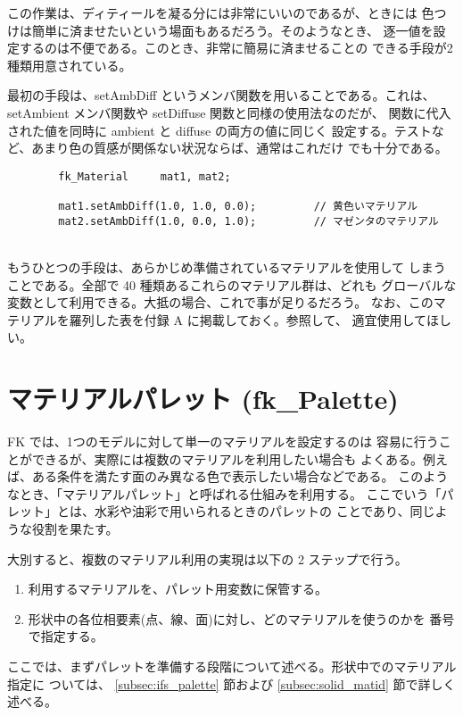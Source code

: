 この作業は、ディティールを凝る分には非常にいいのであるが、ときには
色つけは簡単に済ませたいという場面もあるだろう。そのようなとき、
逐一値を設定するのは不便である。このとき、非常に簡易に済ませることの
できる手段が2種類用意されている。

最初の手段は、setAmbDiff というメンバ関数を用いることである。これは、
setAmbient メンバ関数や setDiffuse 関数と同様の使用法なのだが、
関数に代入された値を同時に ambient と diffuse の両方の値に同じく
設定する。テストなど、あまり色の質感が関係ない状況ならば、通常はこれだけ
でも十分である。
\\
\begin{screen}
\begin{verbatim}
        fk_Material     mat1, mat2;

        mat1.setAmbDiff(1.0, 1.0, 0.0);         // 黄色いマテリアル
        mat2.setAmbDiff(1.0, 0.0, 1.0);         // マゼンタのマテリアル
\end{verbatim}
\end{screen}
\\
もうひとつの手段は、あらかじめ準備されているマテリアルを使用して
しまうことである。全部で 40 種類あるこれらのマテリアル群は、どれも
グローバルな変数として利用できる。大抵の場合、これで事が足りるだろう。
なお、このマテリアルを羅列した表を付録 A に掲載しておく。参照して、
適宜使用してほしい。
\section{マテリアルパレット (fk\_Palette)} \label{sec:mat_palette}
FK では、1つのモデルに対して単一のマテリアルを設定するのは
容易に行うことができるが、実際には複数のマテリアルを利用したい場合も
よくある。例えば、ある条件を満たす面のみ異なる色で表示したい場合などである。
このようなとき、「マテリアルパレット」と呼ばれる仕組みを利用する。
ここでいう「パレット」とは、水彩や油彩で用いられるときのパレットの
ことであり、同じような役割を果たす。

大別すると、複数のマテリアル利用の実現は以下の 2 ステップで行う。
\begin{enumerate}
 \item 利用するマテリアルを、パレット用変数に保管する。
 \item 形状中の各位相要素(点、線、面)に対し、どのマテリアルを使うのかを
	番号で指定する。
\end{enumerate}
ここでは、まずパレットを準備する段階について述べる。形状中でのマテリアル指定に
ついては、
\ref{subsec:ifs_palette} 節および
\ref{subsec:solid_matid} 節で詳しく述べる。

